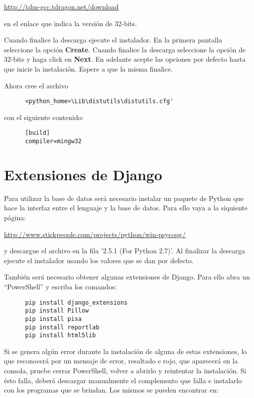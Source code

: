 \documentclass[9pt, letterpaper, oneside]{report}
\begin{document}
    \vspace{3mm}
    \url{http://tdm-gcc.tdragon.net/download}
    \vspace{3mm}
      
    en el enlace que indica la versión de 32-bits.

    Cuando finalice la descarga ejecute el instalador. En la primera pantalla
    seleccione la opción \textbf{Create}. Cuando finalice la descarga seleccione la opción
    de 32-bits y haga click en \textbf{Next}. En adelante acepte las opciones por defecto 
    hasta que inicie la instalación. Espere a que la misma finalice.

    Ahora cree el archivo
    
    \begin{verbatim}
      <python_home>\Lib\distutils\distutils.cfg'
    \end{verbatim}
    
    con el siguiente contenido:

    \begin{verbatim}
      [build]
      compiler=mingw32
    \end{verbatim}

  \section{Extensiones de Django}
    Para utilizar la base de datos será necesario instalar un paquete de Python que 
    hace la interfaz entre el lenguaje y la base de datos. Para ello vaya a la
    siquiente página:
      
    \vspace{3mm}
    \url{http://www.stickpeople.com/projects/python/win-psycopg/}
    \vspace{3mm}
      
    y descargue el archivo en la fila '2.5.1 (For Python 2.7)'. Al finalizar la
    descarga ejecute el instalador usando los valores que se dan por defecto.

    También será necesario obtener algunas extensiones de Django. Para ello abra
    un ``PowerShell'' y escriba los comandos:

    \begin{verbatim}
      pip install django_extensions
      pip install Pillow
      pip install pisa
      pip install reportlab
      pip install html5lib
    \end{verbatim}

    Si se genera algún error durante la instalación de alguna de estas extensiones,
    lo que reconocerá por un mensaje de error, resaltado e rojo, que aparecerá en la
    consola, pruebe cerrar PowerShell, volver a abrirlo y reintentar la instalación.
    Si ésto falla, deberá descargar manualmente el complemento que falla e 
    instalarlo con
    los programas que se brindan. Los mismos se pueden encontrar en:
\end{document}
